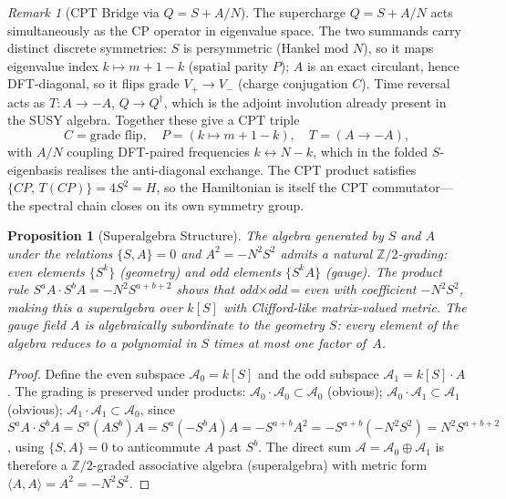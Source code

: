 \documentclass[aip,jmp,reprint,superscriptaddress,floatfix,nofootinbib]{revtex4-2}
\newtheorem{proposition}[theorem]{Proposition}
\theoremstyle{definition}
\theoremstyle{remark}
\newtheorem{remark}[theorem]{Remark}
\begin{document}
\begin{remark}[CPT Bridge via $Q = S + A/N$]
\label{rmk:cpt-bridge}
The supercharge $Q = S + A/N$ acts simultaneously as the $\mathrm{CP}$
operator in eigenvalue space.  The two summands carry distinct discrete
symmetries: $S$ is persymmetric (Hankel mod $N$), so it maps
eigenvalue index $k \mapsto m+1-k$ (spatial parity $P$); $A$ is an
exact circulant, hence DFT-diagonal, so it flips grade $V_+\to V_-$
(charge conjugation $C$).  Time reversal acts as $T\colon A\to -A$,
$Q\to Q^\dagger$, which is the adjoint involution already present in
the SUSY algebra.  Together these give a CPT triple
\[
  C = \text{grade flip},\quad
  P = (k \mapsto m+1-k),\quad
  T = (A \to -A),
\]
with $A/N$ coupling DFT-paired frequencies $k\leftrightarrow N-k$,
which in the folded $S$-eigenbasis realises the anti-diagonal exchange.
The CPT product satisfies $\{CP,\, T(CP)\} = 4S^2 = H$, so the
Hamiltonian is itself the CPT commutator---the spectral chain closes
on its own symmetry group.
\end{remark}

\begin{proposition}[Superalgebra Structure]
\label{prop:superalgebra}
The algebra generated by $S$ and $A$ under the relations $\{S,A\}=0$
and $A^2 = -N^2 S^2$ admits a natural $\mathbb{Z}/2$-grading:
even elements $\{S^k\}$ (geometry) and odd elements $\{S^k A\}$ (gauge).
The product rule $S^a A \cdot S^b A = -N^2 S^{a+b+2}$ shows that
odd$\times$odd$=$even with coefficient $-N^2 S^2$, making this a
superalgebra over $k[S]$ with Clifford-like matrix-valued metric.
The gauge field $A$ is algebraically subordinate to the geometry $S$:
every element of the algebra reduces to a polynomial in $S$ times
at most one factor of~$A$.
\end{proposition}
\begin{proof}
Define the even subspace $\mathcal{A}_0 = k[S]$ and the odd subspace
$\mathcal{A}_1 = k[S] \cdot A$.  The grading is preserved under products:
$\mathcal{A}_0 \cdot \mathcal{A}_0 \subset \mathcal{A}_0$ (obvious);
$\mathcal{A}_0 \cdot \mathcal{A}_1 \subset \mathcal{A}_1$ (obvious);
$\mathcal{A}_1 \cdot \mathcal{A}_1 \subset \mathcal{A}_0$, since
$S^a A \cdot S^b A = S^a (A S^b) A = S^a (-S^b A) A
= -S^{a+b} A^2 = -S^{a+b}(-N^2 S^2) = N^2 S^{a+b+2}$, using
$\{S,A\}=0$ to anticommute $A$ past $S^b$.  The direct sum
$\mathcal{A} = \mathcal{A}_0 \oplus \mathcal{A}_1$ is therefore a
$\mathbb{Z}/2$-graded associative algebra (superalgebra) with
metric form $\langle A, A \rangle = A^2 = -N^2 S^2$.
\end{proof}
\end{document}
